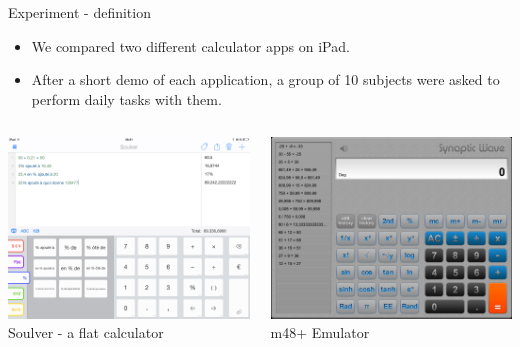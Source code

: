 \documentclass{beamer}
\begin{document}
\begin{frame}{Experiment - definition}

\begin{itemize}
    \item We compared two different calculator apps on iPad.
    \item After a short demo of each application, a group of 10 subjects were asked to perform daily tasks with them.
\end{itemize}

\begin{columns}[c]
        \begin{center}
        \includegraphics[height=.75\textwidth]{soulveur-screen.png}\\
        Soulver - a flat calculator
        \end{center}
       \begin{center}
        \includegraphics[height=.75\textwidth]{m38-screen.png}\\
        m48+ Emulator
        \end{center}
    \end{columns}

\end{frame}
\end{document}
